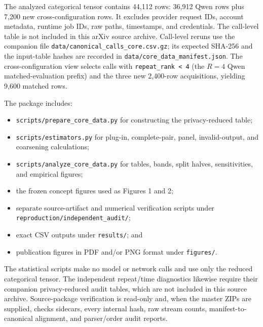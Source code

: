 \documentclass[letterpaper]{article}
\newcommand{\1}{\mathbf 1}
\begin{document}
The analyzed categorical tensor contains 44,112 rows:
36,912 Qwen rows plus 7,200 new cross-configuration rows. It excludes
provider request IDs, account metadata, runtime job IDs, raw paths,
timestamps, and credentials. The call-level table is not included in this
arXiv source archive. Call-level reruns use the companion file
\texttt{data/canonical\_calls\_core.csv.gz}; its expected SHA-256 and the
input-table hashes are recorded in
\texttt{data/core\_data\_manifest.json}. The cross-configuration view selects
calls with \texttt{repeat\_rank < 4} (the $R=4$ Qwen matched-evaluation
prefix) and the three new 2,400-row acquisitions, yielding 9,600 matched rows.

The package includes:
\begin{itemize}
    \item \texttt{scripts/prepare\_core\_data.py} for constructing the
    privacy-reduced table;
    \item \texttt{scripts/estimators.py} for plug-in, complete-pair, panel,
    invalid-output, and coarsening calculations;
    \item \texttt{scripts/analyze\_core\_data.py} for tables, bands, split
    halves, sensitivities, and empirical figures;
    \item the frozen concept figures used as Figures 1 and 2;
    \item separate source-artifact and numerical verification scripts under
    \texttt{reproduction/independent\_audit/};
    \item exact CSV outputs under \texttt{results/}; and
    \item publication figures in PDF and/or PNG format under \texttt{figures/}.
\end{itemize}

The statistical scripts make no model or network calls and use only the
reduced categorical tensor. The independent repeat/time diagnostics likewise
require their companion privacy-reduced audit tables, which are not included
in this source archive. Source-package verification is read-only and, when the
master ZIPs are supplied, checks sidecars, every internal hash, raw stream
counts, manifest-to-canonical alignment, and parser/order audit reports.
\end{document}
